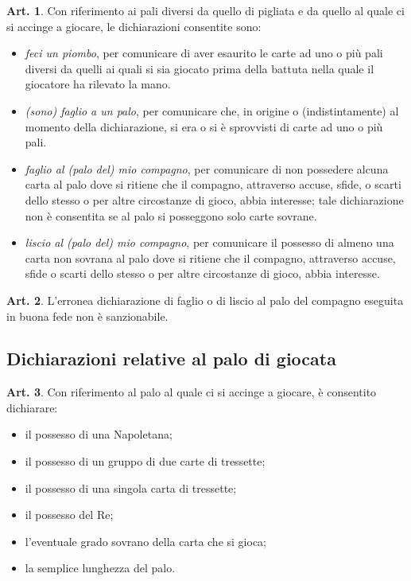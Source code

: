\documentclass[italian,a4paper]{article}
\theoremstyle{definition}
\newtheorem{art}{Art.}
\begin{document}
\begin{art}
Con riferimento ai pali diversi da quello di pigliata e da quello al quale
ci si accinge a giocare, le dichiarazioni consentite sono:
\begin{itemize}
    \item \emph{feci un piombo}, per comunicare di aver esaurito le carte ad uno o
più pali diversi da quelli ai quali si sia giocato prima della battuta nella
quale il giocatore ha rilevato la mano.

   \item \emph{(sono) faglio a un palo}, per comunicare che, in origine o
(indistintamente) al momento della dichiarazione, si era o si è sprovvisti
di carte ad uno o più pali.

\item       \emph{faglio al (palo del) mio compagno}, per comunicare di non
possedere alcuna carta al palo dove si ritiene che il compagno, attraverso
accuse, sfide, o scarti dello stesso o per altre circostanze di gioco, abbia
interesse; tale dichiarazione non è consentita se al palo si posseggono solo
carte sovrane.

\item       \emph{liscio al (palo del)  mio compagno}, per comunicare il possesso di
almeno una carta non sovrana al palo dove si ritiene che il compagno,
attraverso accuse, sfide o scarti dello stesso o per altre circostanze di
gioco, abbia interesse.
\end{itemize}
\end{art}

\begin{art}
L’erronea dichiarazione di faglio o di liscio al palo del compagno eseguita
in buona fede non è sanzionabile.
\end{art}

\subsection*{Dichiarazioni relative al palo di giocata}

\begin{art}
Con riferimento al palo al quale ci si accinge a giocare, è consentito
dichiarare:


\begin{itemize}
\item       il possesso di una Napoletana;
\item       il possesso di un gruppo di due carte di tressette;
\item       il possesso di una singola carta di tressette;
\item       il possesso del Re;
\item       l’eventuale grado sovrano della carta che si gioca;
\item         la semplice lunghezza del palo.
\end{itemize}
\end{art}
\end{document}
